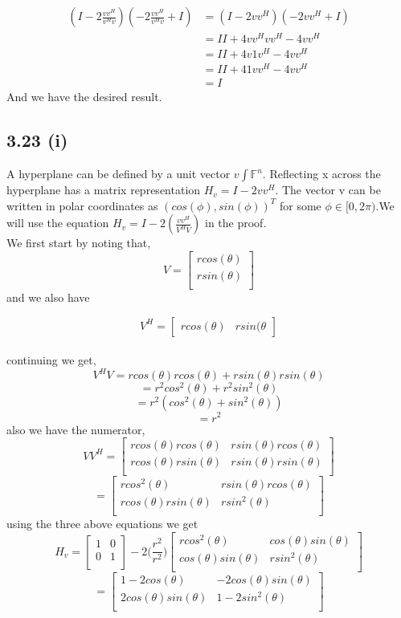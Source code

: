 \documentclass[letterpaper,12pt]{article}
\theoremstyle{definition}
\begin{document}
\begin{align*}
(I - 2 \frac{vv^H}{v^Hv})(- 2 \frac{vv^H}{v^Hv} + I) &=(I - 2 vv^H)(- 2 vv^H + I)\\
&=II + 4 vv^Hvv^H - 4vv^H\\
&=II + 4 v1v^H - 4vv^H\\
&=II + 4 1vv^H - 4vv^H\\
&=I
\end{align*}
And we have the desired result.
\subsection*{3.23 (i)}
A hyperplane can be defined by a unit vector $v\int \mathbb{F}^n$. Reflecting x across the hyperplane has a matrix representation $H_v = I - 2vv^H$.  The vector v can be written in polar coordinates as $(cos(\phi), sin(\phi))^T$ for some $\phi \in [0,2\pi)$.We will use the equation $H_v = I-2(\frac {vv^H}{V^H V})$ in the proof.\\ 
We first start by noting that,   
  \[V= \begin{bmatrix}
    rcos(\theta) \\
    rsin(\theta) \\
    \end{bmatrix}\]
and we also have

    \[V^H= \begin{bmatrix}
    rcos(\theta) & rsin(\theta
    \end{bmatrix}\]\\
continuing we get,
 \[V^H V = rcos(\theta)rcos(\theta)+rsin(\theta)rsin(\theta)\]
 \[=r^2 cos^2(\theta)+ r^2 sin^2(\theta)\]
 \[=r^2(cos^2(\theta)+sin^2(\theta))\]
 \[=r^2\]
also we have the numerator,
\[VV^H= \begin{bmatrix}
    rcos(\theta)rcos(\theta) & rsin(\theta)rcos(\theta) \\
    rcos(\theta)rsin(\theta) & rsin(\theta)rsin(\theta) \\
    \end{bmatrix}\]
\[=
\begin{bmatrix}
    rcos^2(\theta) & rsin(\theta)rcos(\theta) \\
    rcos(\theta)rsin(\theta) & rsin^2(\theta) \\
 \end{bmatrix}
 \]
 using the three above equations we get
 \[H_v=
 \begin{bmatrix}
    1 & 0 \\
    0 & 1 \\
 \end{bmatrix}
-2\big(\frac{r^2}{r^2}\big )\begin{bmatrix}
    rcos^2(\theta) & cos(\theta)sin(\theta) \\
    cos(\theta)sin(\theta) & rsin^2(\theta)\\
 \end{bmatrix}
 \]
\[=
\begin{bmatrix}
    1-2cos(\theta) & -2cos(\theta)sin(\theta) \\
   2cos(\theta)sin(\theta) & 1-2sin^2(\theta) \\
 \end{bmatrix}\]
\end{document}

